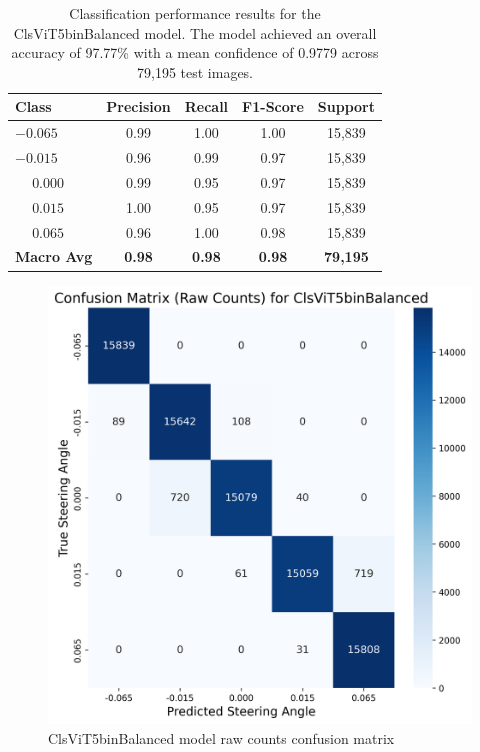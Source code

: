 \begin{table}[htbp]
\centering
\begin{tabular}{@{}lcccc@{}}
\toprule
\textbf{Class} & \textbf{Precision} & \textbf{Recall} & \textbf{F1-Score} & \textbf{Support} \\
\midrule
$-0.065$ & 0.99 & 1.00 & 1.00 & 15,839 \\
$-0.015$ & 0.96 & 0.99 & 0.97 & 15,839 \\
$\phantom{-}0.000$ & 0.99 & 0.95 & 0.97 & 15,839 \\
$\phantom{-}0.015$ & 1.00 & 0.95 & 0.97 & 15,839 \\
$\phantom{-}0.065$ & 0.96 & 1.00 & 0.98 & 15,839 \\
\midrule
\textbf{Macro Avg} & \textbf{0.98} & \textbf{0.98} & \textbf{0.98} & \textbf{79,195} \\
\bottomrule
\end{tabular}
\caption{Classification performance results for the ClsViT5binBalanced model. The model achieved an overall accuracy of 97.77\% with a mean confidence of 0.9779 across 79,195 test images.}
\label{tab:clf_report_ClsViT5binBalanced}
\end{table}

\begin{figure}[H]
\centering
\includegraphics[width=0.65\linewidth]{Figures/Results/cm_raw_ClsViT5binBalanced.png}
\caption{ClsViT5binBalanced model raw counts confusion matrix}
\label{fig:cm_raw_ClsViT5binBalanced}
\end{figure}

